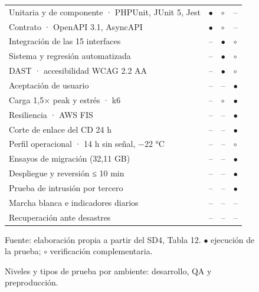 \clearpage
\begin{figure}[p]
\centering
\begingroup\LFXcuerpotabla
\renewcommand{\arraystretch}{1.2}
\begin{tabularx}{\textwidth}{Y L{1.8cm} L{1.9cm} L{2.3cm}}
\toprule
{} &  &  &  \\\midrule
Unitaria y de componente · PHPUnit, JUnit 5, Jest & $\bullet$ & $\circ$ & -- \\
Contrato · OpenAPI 3.1, AsyncAPI & $\bullet$ & $\circ$ & -- \\
Integración de las 15 interfaces & -- & $\bullet$ & $\circ$ \\
Sistema y regresión automatizada & -- & $\bullet$ & $\circ$ \\
DAST · accesibilidad WCAG 2.2 AA & -- & $\bullet$ & $\circ$ \\
Aceptación de usuario & -- & -- & $\bullet$ \\
Carga 1,5× peak y estrés · k6 & -- & $\circ$ & $\bullet$ \\
Resiliencia · AWS FIS & -- & -- & $\bullet$ \\
Corte de enlace del CD 24 h & -- & -- & $\bullet$ \\
Perfil operacional · 14 h sin señal, −22 °C & -- & -- & $\circ$ \\
Ensayos de migración (32,11 GB) & -- & -- & $\bullet$ \\
Despliegue y reversión ≤ 10 min & -- & -- & $\bullet$ \\
Prueba de intrusión por tercero & -- & -- & $\bullet$ \\
Marcha blanca e indicadores diarios & -- & -- & -- \\
Recuperación ante desastres & -- & -- & -- \\
\bottomrule\end{tabularx}\endgroup
\caption{Niveles y tipos de prueba por ambiente: desarrollo, QA y preproducción.}\label{fig:sd9-4}
{\fontsize{9.5pt}{12pt}\selectfont Fuente: elaboración propia a partir del SD4, Tabla 12. $\bullet$ ejecución de la prueba; $\circ$ verificación complementaria.\par}
\end{figure}
\clearpage
\clearpage
